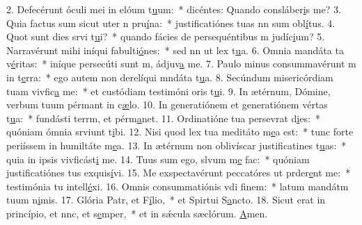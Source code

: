 2. Defecérunt óculi mei in elóum t\uline{u}um:~* dicéntes: Quando consláber\uline{i}s me?
3. Quia factus sum sicut uter n pru\uline{í}na:~* justificatiónes tuas nn sum obl\uline{í}tus.
4. Quot sunt dies srvi t\uline{u}i?~* quando fácies de persequéntibus m judíc\uline{i}um?
5. Narravérunt mihi iníqui fabulti\uline{ó}nes:~* sed nn ut lex t\uline{u}a.
6. Omnia mandáta ta v\uline{é}ritas:~* iníque persecúti sunt m, ádjuv\uline{a} me.
7. Paulo minus consummavérunt m in t\uline{e}rra:~* ego autem non derelíqui mndáta t\uline{u}a.
8. Secúndum misericórdiam tuam vivfic\uline{a} me:~* et custódiam testimóni oris t\uline{u}i.
9. In ætérnum, Dómine, verbum tuum pérmant in c\uline{æ}lo.
10. In generatiónem et generatiónem vértas t\uline{u}a:~* fundásti terrm, et pérm\uline{a}net.
11. Ordinatióne tua persevrat d\uline{i}es:~* quóniam ómnia srviunt t\uline{i}bi.
12. Nisi quod lex tua meditáto m\uline{e}a est:~* tunc forte periíssem in humiltáte m\uline{e}a.
13. In ætérnum non oblivíscar justificatines t\uline{u}as:~* quia in ipsis vivficást\uline{i} me.
14. Tuus sum ego, slvum m\uline{e} fac:~* quóniam justificatiónes tus exquis\uline{í}vi.
15. Me exspectavérunt peccatóres ut prder\uline{e}nt me:~* testimónia tu intell\uline{é}xi.
16. Omnis consummatiónis vdi f\uline{i}nem:~* latum mandátm tuum n\uline{i}mis.
17. Glória Patr, et F\uline{í}lio,~* et Spirtui S\uline{a}ncto.
18. Sicut erat in princípio, et nnc, et s\uline{e}mper,~* et in sǽcula sæclórum. \uline{A}men.
